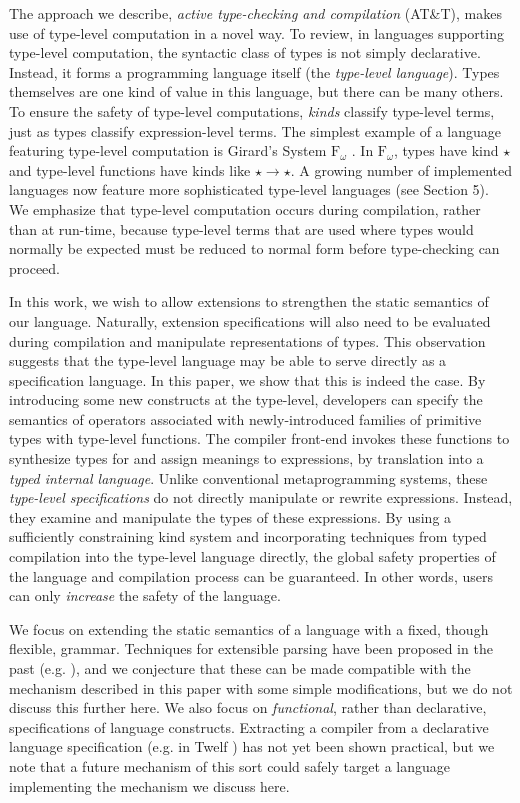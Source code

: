 \documentclass[10pt]{sigplanconf}
\begin{document}
The approach we describe, {\it active type-checking and compilation} (AT\&T), makes use of type-level computation in a novel way. To review, in languages supporting type-level computation, the syntactic class of types is not simply declarative. Instead, it forms a programming language itself (the {\it type-level language}). Types themselves are one kind of value in this language, but there can be many others. To ensure the safety of type-level computations, {\it kinds} classify type-level terms, just as types classify expression-level terms. The simplest example of a language featuring type-level computation is Girard's System $\text{F}_{\omega}$ \cite{tapl}. In $\text{F}_{\omega}$, types have kind $\star$ and type-level functions have kinds like $\star\rightarrow\star$. A growing number of implemented languages now feature more sophisticated type-level languages (see Section 5).  
We emphasize that type-level computation occurs during compilation, rather than at run-time, because type-level terms that are used where types would normally be expected must be reduced to normal form before type-checking can proceed. 

In this work, we wish to allow extensions to strengthen the static semantics of our language. Naturally, extension specifications will also need to be evaluated during compilation and manipulate representations of types. This observation suggests that the type-level language may be able to serve directly as a specification language. In this paper, we show that this is indeed the case. By introducing some new constructs at the type-level, developers can specify the semantics of operators associated with newly-introduced families of primitive types with type-level functions. The compiler front-end invokes these functions to synthesize types for and assign meanings to expressions, by translation into a {\it typed internal language}. Unlike conventional metaprogramming systems, these {\it type-level specifications} do not directly manipulate or rewrite expressions. Instead, they examine and manipulate the types of these expressions. 
By using a sufficiently constraining kind system and incorporating techniques from typed compilation into the type-level language directly, the global safety properties of the language and compilation process can be guaranteed. In other words, users can only {\it increase} the safety of the language.

We focus on extending the static semantics of a language with a fixed, though flexible, grammar. Techniques for extensible parsing have been proposed in the past (e.g. \cite{journals/entcs/BrabrandSV03}), and we conjecture that these can be made compatible with the mechanism described in this paper with some simple modifications, but we do not discuss this further here. We also focus on {\it functional}, rather than declarative, specifications of language constructs. Extracting a compiler from a declarative language specification (e.g. in Twelf \cite{twelf}) has not yet been shown practical, but we note that a future mechanism of this sort could safely target a language implementing the mechanism we discuss here.
\end{document}
